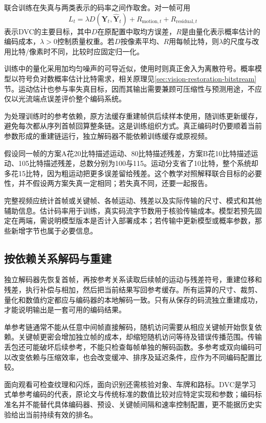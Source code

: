 联合训练在失真与两类表示的码率之间作取舍。对一帧可用
\begin{equation}
  L_t=\lambda D(\bm{Y}_t,\widehat{\bm{Y}}_t)
       +R_{\mathrm{motion},t}+R_{\mathrm{residual},t}
  \label{eq:vision-video-rate-distortion}
\end{equation}
表示DVC的主要目标，其中$D$在原配置中取均方误差，$R$是由量化表示概率估计的编码成本，$\lambda>0$控制质量权重。若$D$按像素平均、$R$用每帧比特，则$\lambda$的尺度与改用比特/像素时不同，比较时应固定归一化。

训练中的量化采用加均匀噪声的可导近似，使用时则真正舍入为离散符号。概率模型以符号负对数概率估计比特需求，相关原理见\ref{sec:vision-restoration-bitstream}节。运动估计也参与率失真目标，因而其输出需要兼顾可压缩性与预测用途，不应仅以光流端点误差评价整个编码系统。

为处理训练时的参考依赖，原方法缓存重建帧供后续样本使用，随训练更新缓存，避免每次都从序列首帧回算整条链。这是训练组织方式。真正编码时仍要顺着当前参数形成的重建链运行，独立解码器不能依赖训练缓存或原视频。

假设同一帧的方案A花20比特描述运动、80比特描述残差，方案B花10比特描述运动、105比特描述残差，总数分别为100与115。运动分支省了10比特，整个系统却多花15比特，因为粗运动把更多误差留给残差。这个教学对照解释联合目标的必要性，并不假设两方案失真一定相同；若失真不同，还要一起报告。

完整视频应统计首帧或关键帧、各帧运动、残差以及实际传输的尺寸、模式和其他辅助信息。估计码率用于训练，真实码流字节数用于核验传输成本。模型若预先固定在两端，需说明模型版本是否计入部署成本；若传输中更新模型或概率参数，那些新增字节也属于必要信息。

\subsection{按依赖关系解码与重建}
\label{sec:vision-video-decoding}

独立解码器先恢复首帧，再按参考关系读取后续帧的运动与残差符号，重建位移和残差，执行补偿与相加，然后把当前结果写回参考缓存。所有运算的尺寸、裁剪、量化和数值约定都应与编码器的本地解码一致。只有从保存的码流独立重建成功，才能说明输出是一套可用的编码结果。

单参考链通常不能从任意中间帧直接解码，随机访问需要从相应关键帧开始恢复依赖。关键帧更密会增加独立帧的成本，却缩短随机访问等待及错误传播范围。传输丢包还可能破坏后续参考，不能只检查每帧单独的解码函数。多参考或双向编码可以改变依赖与压缩效率，也会改变缓冲、排序及延迟条件，应作为不同编码配置比较。

面向观看可检查纹理和闪烁，面向识别还需核验对象、车牌和路标。DVC是学习式单参考编码的代表，原论文与传统标准的数值比较对应特定实现和参数；编码标准名并不能替代具体编码器、预设、关键帧间隔和速率控制配置，更不能据历史实验给出当前持续有效的排名。

